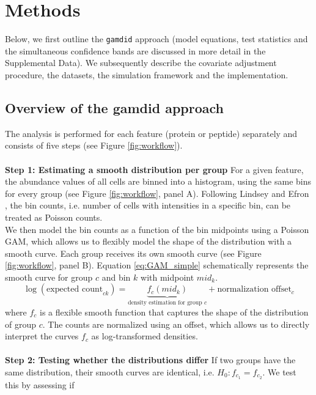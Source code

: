 \section{Methods} \label{methods}
{Below, we first outline the \texttt{gamdid} approach (model equations,
test statistics and the simultaneous confidence bands are discussed in
more detail in the Supplemental Data).
We subsequently describe the covariate adjustment procedure, the datasets,
the simulation framework and the implementation.

\subsection{Overview of the gamdid approach}

The analysis is performed for each feature (protein or peptide) separately and
consists of five steps (see Figure \ref{fig:workflow}).
\\
\\
\textbf{Step 1: Estimating a smooth distribution per group}
For a given feature, the abundance values of all cells are binned into a histogram,
using the same bins for every group (see Figure \ref{fig:workflow}, panel A).
Following Lindsey \cite{lindsay_method} and Efron \cite{efron}, the bin counts,
i.e. number of cells with intensities in a specific bin,
can be treated as Poisson counts.
\\
We then model the bin counts as a function of the bin midpoints using a
Poisson GAM, which allows us to flexibly model the
shape of the distribution with a smooth curve. Each group receives its own
smooth curve (see Figure \ref{fig:workflow}, panel B).
Equation \ref{eq:GAM_simple} schematically represents the smooth curve for group $c$
and bin $k$ with midpoint $mid_k$.
\begin{equation}
    \log(\text{expected count}_{ck}) = \underbrace{f_c(mid_k)}_{\text{density estimation for group } c} + \text{normalization offset}_c
    \label{eq:GAM_simple}
\end{equation}
where $f_c$ is a flexible smooth function that captures the shape of the distribution of group $c$.
The counts are normalized using an offset, which allows us to directly interpret the curves $f_c$
as log-transformed densities.
\\
\\
\textbf{Step 2: Testing whether the distributions differ}
If two groups have the same distribution, their smooth curves are identical,
i.e. $H_0: f_{c_1} = f_{c_2}$. We test this by assessing if
}
